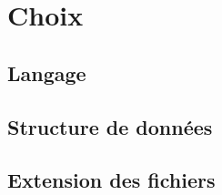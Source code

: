  \section{Choix}
 
  \subsection{Langage}

  \subsection{Structure de données}

  

  \subsection{Extension des fichiers}
